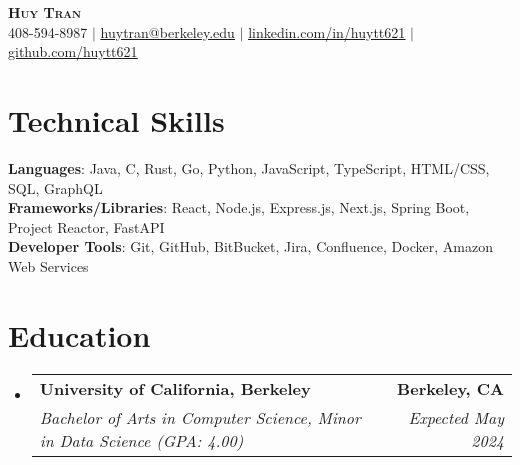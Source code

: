 \documentclass[letterpaper,11pt]{article}
\makeatletter
\newcommand{\resumeSubheading}[4]{
  \vspace{-2pt}\item
    \begin{tabular*}{0.97\textwidth}[t]{l@{\extracolsep{\fill}}r}
      \textbf{#1} & #2 \\
      \textit{\small#3} & \textit{\small #4} \\
    \end{tabular*}\vspace{-7pt}
}
\newcommand{\resumeSubHeadingListStart}{\begin{itemize}[leftmargin=0.15in, label={}]}
\newcommand{\resumeSubHeadingListEnd}{\end{itemize}}
\makeatother
\begin{document}

\begin{center}
    \textbf{\Huge \scshape Huy Tran} \\ \vspace{1pt}
    \small 408-594-8987 $|$ \href{mailto:huytran@berkeley.edu}{\underline{huytran@berkeley.edu}} $|$ 
    \href{https://linkedin.com/in/huytt621}{\underline{linkedin.com/in/huytt621}} $|$
    \href{https://github.com/huytt621}{\underline{github.com/huytt621}}
\end{center}


%
\section{\textbf{Technical Skills}}
 \begin{itemize}[leftmargin=0.15in, label={}]
    \small{\item{
     \textbf{Languages}{: Java, C, Rust, Go, Python, JavaScript, TypeScript, HTML/CSS, SQL, GraphQL} \\
     \textbf{Frameworks/Libraries}{: React, Node.js, Express.js, Next.js, Spring Boot, Project Reactor, FastAPI} \\
     \textbf{Developer Tools}{: Git, GitHub, BitBucket, Jira, Confluence, Docker, Amazon Web Services} \\
    }}
 \end{itemize}


\section{\textbf{Education}}
  \resumeSubHeadingListStart
    \resumeSubheading
      {University of California, Berkeley}{\textbf{Berkeley, CA}}
      {Bachelor of Arts in Computer Science, Minor in Data Science (GPA: 4.00)}{Expected May 2024}

  \resumeSubHeadingListEnd
\end{document}

